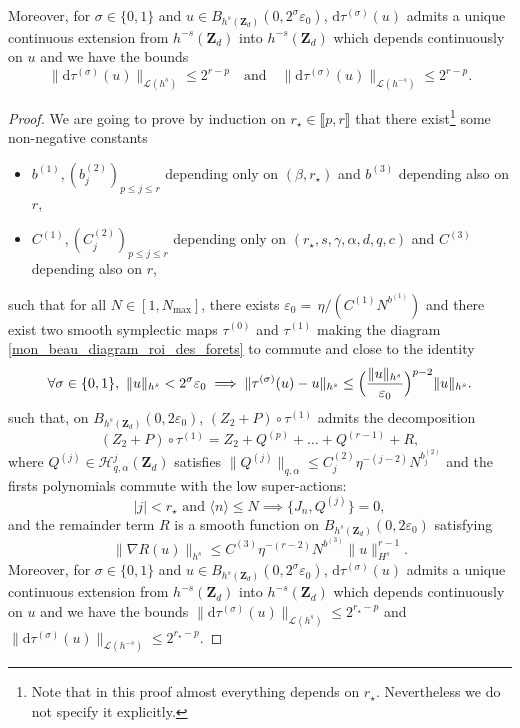 \begin{theorem}
Moreover, for $\sigma\in \{0,1 \}$ and $u\in B_{h^s(\mathbf{Z}_d)}(0,2^{\sigma}\varepsilon_0)$, $\mathrm{d}\tau^{(\sigma)}(u)$ admits a unique continuous extension from $h^{-s}(\mathbf{Z}_d)$ into $h^{-s}(\mathbf{Z}_d)$ which depends continuously on $u$ and we have the bounds
\[
\|\mathrm{d} \tau^{(\sigma)}(u) \|_{\mathscr{L}(h^{s})} \leq 2^{r-p} \quad \text{and} \quad \|\mathrm{d} \tau^{(\sigma)}(u) \|_{\mathscr{L}(h^{-s})} \leq 2^{r-p}.
\]
\end{theorem}
\begin{proof} We are going to prove by induction on $r_{\star} \in \llbracket p,r \rrbracket$ that there exist\footnote{Note that in this proof almost everything depends on $r_\star$. Nevertheless we do not specify it explicitly.} some non-negative constants
\begin{itemize}
\item $b^{(1)},(b_j^{(2)})_{ p \leq j \leq r}$ depending only on $(\beta,r_\star)$ and $b^{(3)}$ depending also on $r$,
\item $C^{(1)},(C_{j}^{(2)})_{ p \leq j \leq r }$ depending only on $(r_\star,s,\gamma,\alpha,d,q,c)$ and $C^{(3)}$ depending also on $r$,
\end{itemize}
such that for all $N\in [1,N_{\max}]$, there exists $\varepsilon_0 = \, \eta /(C^{(1)} N^{b^{(1)}})$ and there exist two smooth symplectic maps $\tau^{(0)}$ and $\tau^{(1)}$
making the diagram \eqref{mon_beau_diagram_roi_des_forets} to commute and close to the identity
\begin{equation}
\label{eq_close_to_the_id_pres}
\forall \sigma\in \{0,1\}, \ \|u\|_{{h}^s} <2^{\sigma}\varepsilon_0 \implies
\|\tau^{(\sigma)}(u)-u\|_{h^s} \leq \Bigl(\frac{\|u\|_{h^s}}{\varepsilon_0} \Bigr)^{p-2} \|u\|_{h^s}.
\end{equation}
such that, on $ B_{h^s(\mathbf{Z}_d)}(0,2\varepsilon_0)$, $(Z_2+P) \circ \tau^{(1)}$ admits the decomposition
\[
(Z_2+P) \circ \tau^{(1)} = Z_2+ Q^{(p)} + \dots + Q^{(r-1)} + R,
\]
where $Q^{(j)} \in \mathscr{H}_{q,\alpha}^j(\mathbf{Z}_d)$ satisfies $ \| Q^{(j)} \|_{q,\alpha} \leq C_{j}^{(2)} \eta^{-(j-2)} N^{b_j^{(2)}}$ and the firsts polynomials commute with the low super-actions:
\[
|j| < r_{\star} \text{ and } \langle n \rangle\leq N \implies \{ J_n, Q^{(j)} \} = 0,
\]
and the remainder term $R$ is a smooth function on $B_{h^s(\mathbf{Z}_d)}(0,2\varepsilon_0)$ satisfying
\[
\|\nabla R(u)\|_{h^s} \leq C^{(3)} \eta^{-(r-2)} N^{b^{(3)}} \|u\|_{H^s}^{r-1}.
\]
Moreover, for $\sigma\in \{0,1 \}$ and $u\in B_{h^s(\mathbf{Z}_d)}(0,2^{\sigma}\varepsilon_0)$, $\mathrm{d}\tau^{(\sigma)}(u)$ admits a unique continuous extension from $h^{-s}(\mathbf{Z}_d)$ into $h^{-s}(\mathbf{Z}_d)$ which depends continuously on $u$ and we have the bounds
$\|\mathrm{d} \tau^{(\sigma)}(u) \|_{\mathscr{L}(h^{s})} \leq 2^{r_{\star}-p} $ and $\|\mathrm{d} \tau^{(\sigma)}(u) \|_{\mathscr{L}(h^{-s})} \leq 2^{r_{\star}-p}$.


\end{proof}
